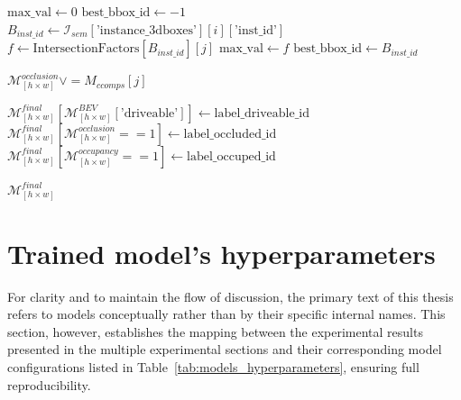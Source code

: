\begin{algorithm}
\begin{algorithmic}[1]
             
                \State $\text{max\_val} \gets 0$
                \State $\text{best\_bbox\_id} \gets -1$
                    \State $B_{inst\_id} \gets \mathcal{I}_{sem}[\text{'instance\_3dboxes'}][i][\text{'inst\_id'}]$
                    \State $f \gets \text{IntersectionFactors}[B_{inst\_id}][j]$
                        \State $\text{max\_val} \gets f$
                        \State $\text{best\_bbox\_id} \gets B_{inst\_id}$
                    \EndIf
                \EndFor

                    \State $\mathcal{M}^{occlusion}_{\left[h \times w\right]} \lor = M_{ccomps}[j]$
                \EndIf
            \EndFor

        \EndFor
        
        \State $\mathcal{M}^{final}_{\left[h \times w\right]}[\mathcal{M}^{BEV}_{\left[h \times w\right]}[\text{'driveable'}]] \gets \text{label\_driveable\_id}$
        \State $\mathcal{M}^{final}_{\left[h \times w\right]}[\mathcal{M}^{occlusion}_{\left[h \times w\right]} == 1] \gets \text{label\_occluded\_id}$
        \State $\mathcal{M}^{final}_{\left[h \times w\right]}[\mathcal{M}^{occupancy}_{\left[h \times w\right]} == 1] \gets \text{label\_occuped\_id}$
        
        \State \Return $\mathcal{M}^{final}_{\left[h \times w\right]}$
    \end{algorithmic}
\end{algorithm}
\newpage


\section{Trained model's hyperparameters} \label{appendix:models_hyperparameters}
For clarity and to maintain the flow of discussion, the primary text of this thesis refers to models conceptually rather than by their specific internal names. This section, however, establishes the mapping between the experimental results presented in the multiple experimental sections and their corresponding model configurations listed in Table~\ref{tab:models_hyperparameters}, ensuring full reproducibility.

